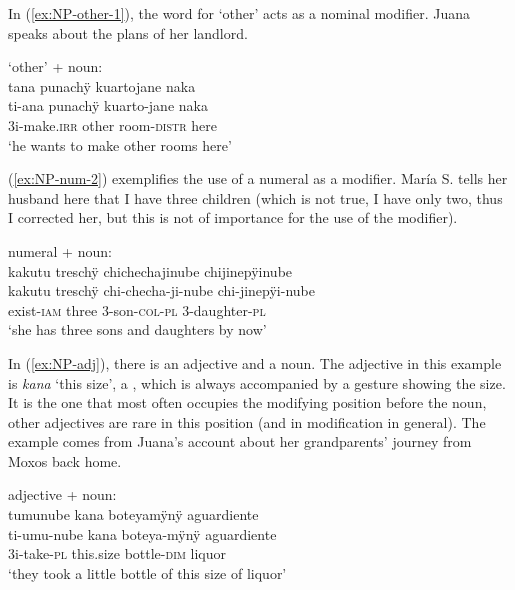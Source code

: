 In (\ref{ex:NP-other-1}), the word for ‘other’ acts as a nominal modifier. Juana speaks about the plans of her landlord.

\ea\label{ex:NP-other-1}
\begingl
\glpreamble \textup{‘other’ + noun:}\\tana punachÿ kuartojane naka\\
\gla ti-ana punachÿ kuarto-jane naka\\
\glb 3i-make.\textsc{irr} other room-\textsc{distr} here\\
\glft ‘he wants to make other rooms here’
\endgl
\trailingcitation{[jxx-p120430l-1.393]}
\xe

(\ref{ex:NP-num-2}) exemplifies the use of a numeral as a modifier. María S. tells her husband here that I have three children (which is not true, I have only two, thus I corrected her, but this is not of importance for the use of the modifier). 

\ea\label{ex:NP-num-2}
\begingl
\glpreamble \textup{numeral + noun:}\\kakutu treschÿ chichechajinube chijinepÿinube\\
\gla kakutu treschÿ chi-checha-ji-nube chi-jinepÿi-nube\\
\glb exist-\textsc{iam} three 3-son-\textsc{col}-\textsc{pl} 3-daughter-\textsc{pl}\\
\glft ‘she has three sons and daughters by now’
\endgl
\trailingcitation{[rmx-e150922l.076]}
\xe


In (\ref{ex:NP-adj}), there is an adjective  and a noun. The adjective in this example is \textit{kana} ‘this size’, a , which is always accompanied by a gesture showing the size. It is the one that most often occupies the modifying position before the noun, other adjectives are rare in this position (and in modification in general). The example comes from Juana’s account about her grandparents’ journey from Moxos back home.

\ea\label{ex:NP-adj}
\begingl
\glpreamble \textup{adjective + noun:}\\tumunube kana boteyamÿnÿ aguardiente\\
\gla ti-umu-nube kana boteya-mÿnÿ aguardiente\\
\glb 3i-take-\textsc{pl} this.size bottle-\textsc{dim} liquor\\
\glft ‘they took a little bottle of this size of liquor'
\endgl
\trailingcitation{[jxx-p151016l-2.235]}
\xe{}

